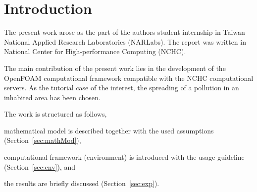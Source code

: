\cleardoublepage
{}
\section{Introduction}
\label{sec:intro}

The present work arose as the part of the authors student internship in Taiwan National Applied Research Laboratories (NARLabs). The report was written in National Center for High-performance Computing (NCHC). 

The main contribution of the present work lies in the  development of the OpenFOAM computational framework compatible with the NCHC computational servers. As the tutorial case of the interest, the spreading of a pollution in an inhabited area has been chosen. 

The work is structured as follows, 
\begin{inparaenum}[(i)]
    \item mathematical model is described together with the used assumptions (Section~\ref{sec:mathMod}), 
    \item computational framework (environment) is introduced with the usage guideline (Section~\ref{sec:env}), and
    \item the results are briefly discussed (Section~\ref{sec:exp}).
\end{inparaenum}

